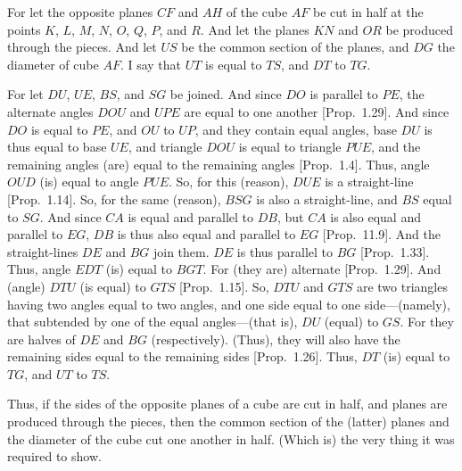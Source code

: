 \begin{Parallel}{}{}
{\epsfysize=2.3in
\centerline{}

For let the opposite planes $CF$ and $AH$ of the cube $AF$ be
cut in half at the points $K$, $L$, $M$, $N$, $O$, $Q$, $P$, and $R$. 
And let the planes $KN$ and $OR$ be produced through the
pieces. And let $US$ be the common section of the planes, and
$DG$ the diameter of cube $AF$. I say that $UT$ is equal to $TS$, and
$DT$ to $TG$.

For let $DU$, $UE$, $BS$, and $SG$ be joined. And since
$DO$ is parallel to $PE$, the alternate angles $DOU$ and $UPE$
are equal to one another [Prop.~1.29].
And since $DO$ is equal to $PE$, and $OU$ to $UP$, and they contain
equal angles, base $DU$ is thus equal to base $UE$, and triangle
$DOU$ is equal to triangle $PUE$, and the remaining angles (are) equal to
the remaining angles [Prop.~1.4]. Thus,
angle $OUD$ (is) equal to angle $PUE$. So, for  this (reason),
$DUE$ is a straight-line [Prop.~1.14].
So, for the same (reason), $BSG$ is also a straight-line, and $BS$ equal to
$SG$. And since $CA$ is equal and parallel to $DB$, but
$CA$ is also equal and parallel to $EG$, $DB$ is thus also equal and parallel 
to $EG$ [Prop.~11.9]. And the straight-lines
$DE$ and $BG$ join them. $DE$ is thus parallel to $BG$ [Prop.~1.33]. Thus, angle $EDT$ (is) equal to $BGT$.
For (they are) alternate [Prop.~1.29]. And (angle)
$DTU$ (is equal) to $GTS$ [Prop.~1.15]. So, $DTU$ and $GTS$ are two triangles having
two angles equal to two angles, and one side equal to one side---(namely),
that subtended by one of the equal angles---(that is), $DU$ (equal) to
$GS$. For they are halves of $DE$ and $BG$ (respectively).
(Thus), they will also have the remaining sides equal to the remaining
sides [Prop.~1.26]. Thus, $DT$ (is) equal
to $TG$, and $UT$ to $TS$.

Thus, if the sides of the opposite planes of a cube are cut in half, and planes are produced through the pieces, then the common section of the (latter) planes and the diameter of the cube cut one another in half. (Which is) the very thing it
was required to show.}
\end{Parallel}

